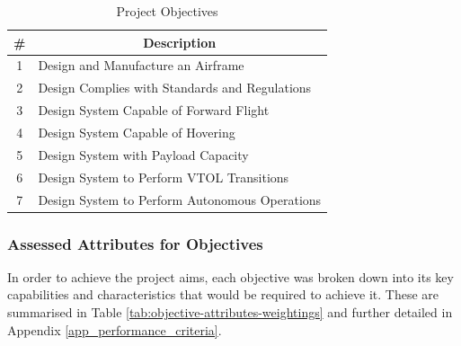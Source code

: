 \begin{table}[H]
\caption{Project Objectives}
\label{tab:objectives}
\centering
\begin{tabular}{|c|p{10cm}|}
\hline
             \#                       & \multicolumn{1}{c|}{\textbf{Description}} \\\hline
1 & Design and Manufacture an Airframe                                    \\
2 & Design Complies with Standards and Regulations                                     \\
3 & Design System Capable of Forward Flight                                                \\
4 & Design System Capable of Hovering                                                \\
5 & Design System with Payload Capacity                                                                   \\
6 & Design System to Perform VTOL Transitions                                                               \\
7 & Design System to Perform Autonomous Operations                                                              \\\hline
\end{tabular}
\end{table}



\subsubsection{Assessed Attributes for Objectives}

In order to achieve the project aims, each objective was broken down into its key capabilities and characteristics that would be required to achieve it. These are summarised in Table \ref{tab:objective-attributes-weightings} and further detailed in Appendix \ref{app_performance_criteria}.









